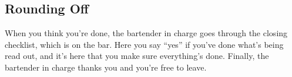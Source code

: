 \subsection{Rounding Off}
\label{sec:post:rounding-off}

When you think you're done, the bartender in charge goes through the closing checklist,
which is on the bar. Here you say ``yes'' if you've done what's being read out,
and it's here that you make sure everything's done. Finally, the bartender in charge thanks you and you're free to leave.
